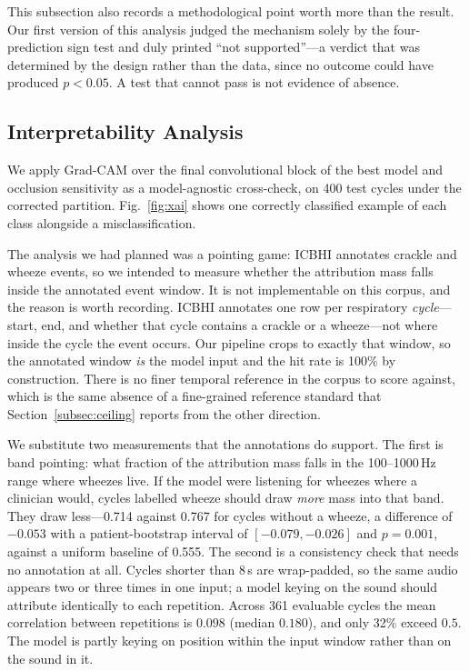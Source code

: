 \documentclass[journal,onecolumn]{IEEEtran}
\begin{document}
This subsection also records a methodological point worth more than the result. Our
first version of this analysis judged the mechanism solely by the four-prediction sign
test and duly printed ``not supported''---a verdict that was determined by the design
rather than the data, since no outcome could have produced $p<0.05$. A test that cannot
pass is not evidence of absence.

\subsection{Interpretability Analysis}
\label{subsec:xai}

We apply Grad-CAM over the final convolutional block of the best model and occlusion
sensitivity as a model-agnostic cross-check, on 400 test cycles under the corrected
partition. Fig.~\ref{fig:xai} shows one correctly classified example of each class
alongside a misclassification.

The analysis we had planned was a pointing game: ICBHI annotates crackle and wheeze
events, so we intended to measure whether the attribution mass falls inside the
annotated event window. It is not implementable on this corpus, and the reason is worth
recording. ICBHI annotates one row per respiratory \emph{cycle}---start, end, and
whether that cycle contains a crackle or a wheeze---not where inside the cycle the event
occurs. Our pipeline crops to exactly that window, so the annotated window \emph{is} the
model input and the hit rate is 100\% by construction. There is no finer temporal
reference in the corpus to score against, which is the same absence of a fine-grained
reference standard that Section~\ref{subsec:ceiling} reports from the other direction.

We substitute two measurements that the annotations do support. The first is band
pointing: what fraction of the attribution mass falls in the 100--1000\,Hz range where
wheezes live. If the model were listening for wheezes where a clinician would, cycles
labelled wheeze should draw \emph{more} mass into that band. They draw less---0.714
against 0.767 for cycles without a wheeze, a difference of $-0.053$ with a
patient-bootstrap interval of $[-0.079, -0.026]$ and $p = 0.001$, against a uniform
baseline of 0.555. The second is a consistency check that needs no annotation at all.
Cycles shorter than 8\,s are wrap-padded, so the same audio appears two or three times
in one input; a model keying on the sound should attribute identically to each
repetition. Across 361 evaluable cycles the mean correlation between repetitions is
$0.098$ (median $0.180$), and only 32\% exceed $0.5$. The model is partly keying on
position within the input window rather than on the sound in it.
\end{document}
